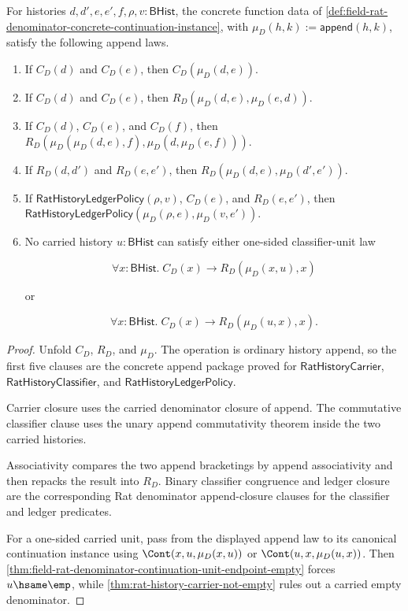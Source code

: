\begin{theorem}
\label{thm:field-rat-denominator-append-concrete-instance-laws}
For histories $d,d',e,e',f,\rho,v:\mathsf{BHist}$, the concrete function data
of \autoref{def:field-rat-denominator-concrete-continuation-instance}, with
$\mu_D(h,k):=\mathsf{append}(h,k)$, satisfy the following append laws.
\begin{enumerate}
  \item If $C_D(d)$ and $C_D(e)$, then $C_D(\mu_D(d,e))$.
  \item If $C_D(d)$ and $C_D(e)$, then $R_D(\mu_D(d,e),\mu_D(e,d))$.
  \item If $C_D(d)$, $C_D(e)$, and $C_D(f)$, then
  $R_D(\mu_D(\mu_D(d,e),f),\mu_D(d,\mu_D(e,f)))$.
  \item If $R_D(d,d')$ and $R_D(e,e')$, then
  $R_D(\mu_D(d,e),\mu_D(d',e'))$.
  \item If $\mathsf{RatHistoryLedgerPolicy}(\rho,v)$, $C_D(e)$, and
  $R_D(e,e')$, then
  $\mathsf{RatHistoryLedgerPolicy}(\mu_D(\rho,e),\mu_D(v,e'))$.
  \item No carried history $u:\mathsf{BHist}$ can satisfy either one-sided
  classifier-unit law

  $$
  \forall x:\mathsf{BHist}.\;
  C_D(x)\to
  R_D(\mu_D(x,u),x)
  $$

  or

  $$
  \forall x:\mathsf{BHist}.\;
  C_D(x)\to
  R_D(\mu_D(u,x),x).
  $$
\end{enumerate}
\end{theorem}
\begin{proof}
Unfold $C_D$, $R_D$, and $\mu_D$. The operation is ordinary history append,
so the first five clauses are the concrete append package proved for
$\mathsf{RatHistoryCarrier}$, $\mathsf{RatHistoryClassifier}$, and
$\mathsf{RatHistoryLedgerPolicy}$.

Carrier closure uses the carried denominator closure of append. The
commutative classifier clause uses the unary append commutativity theorem
inside the two carried histories.

Associativity compares the two append bracketings by append associativity and
then repacks the result into $R_D$. Binary classifier congruence and ledger
closure are the corresponding Rat denominator append-closure clauses for the
classifier and ledger predicates.

For a one-sided carried unit, pass from the displayed append law to its
canonical continuation instance using $\Cont(x,u,\mu_D(x,u))$ or
$\Cont(u,x,\mu_D(u,x))$. Then
\autoref{thm:field-rat-denominator-continuation-unit-endpoint-empty} forces
$u\hsame\emp$, while \autoref{thm:rat-history-carrier-not-empty} rules out a
carried empty denominator.
\end{proof}

